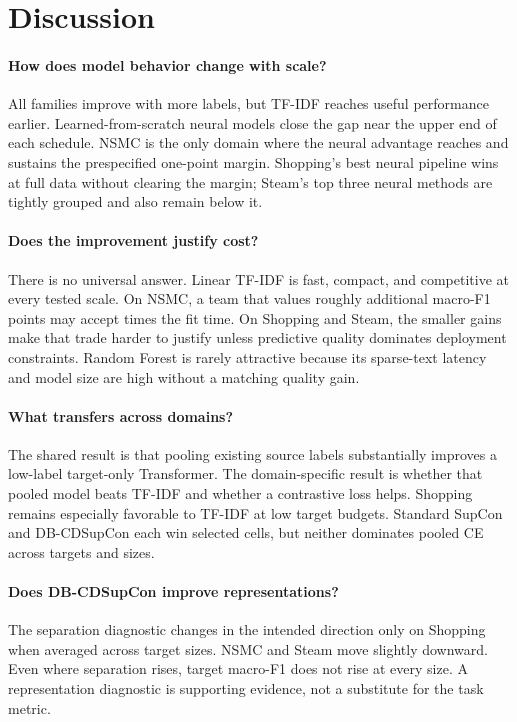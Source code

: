 \section{Discussion}

\paragraph{How does model behavior change with scale?}
All families improve with more labels, but TF-IDF reaches useful performance earlier. Learned-from-scratch neural models close the gap near the upper end of each schedule. NSMC is the only domain where the neural advantage reaches and sustains the prespecified one-point margin. Shopping's best neural pipeline wins at full data without clearing the margin; Steam's top three neural methods are tightly grouped and also remain below it.

\paragraph{Does the improvement justify cost?}
There is no universal answer. Linear TF-IDF is fast, compact, and competitive at every tested scale. On NSMC, a team that values roughly  additional macro-F1 points may accept  times the fit time. On Shopping and Steam, the smaller gains make that trade harder to justify unless predictive quality dominates deployment constraints. Random Forest is rarely attractive because its sparse-text latency and model size are high without a matching quality gain.

\paragraph{What transfers across domains?}
The shared result is that pooling existing source labels substantially improves a low-label target-only Transformer. The domain-specific result is whether that pooled model beats TF-IDF and whether a contrastive loss helps. Shopping remains especially favorable to TF-IDF at low target budgets. Standard SupCon and DB-CDSupCon each win selected cells, but neither dominates pooled CE across targets and sizes.

\paragraph{Does DB-CDSupCon improve representations?}
The separation diagnostic changes in the intended direction only on Shopping when averaged across target sizes. NSMC and Steam move slightly downward. Even where separation rises, target macro-F1 does not rise at every size. A representation diagnostic is supporting evidence, not a substitute for the task metric.

